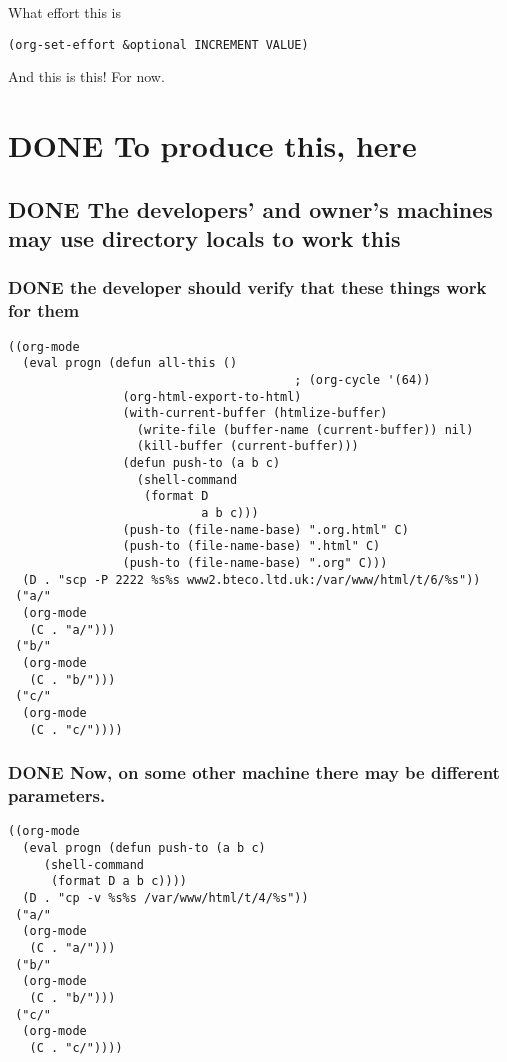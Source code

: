 \documentclass[11pt]{article}
\begin{document}
  What effort this is


\begin{verbatim}
(org-set-effort &optional INCREMENT VALUE)
\end{verbatim}

And this is this! For now.
\section*{\textbf{DONE} To produce this, here}
\label{sec-5}
\subsection*{\textbf{DONE} The developers' and owner's machines may use directory locals to work this}
\label{sec-5-1}
\subsubsection*{\textbf{DONE} the developer should verify that these things work for \textbf{them}}
\label{sec-5-1-1}



\begin{verbatim}
((org-mode
  (eval progn (defun all-this ()
                                        ; (org-cycle '(64))
                (org-html-export-to-html)
                (with-current-buffer (htmlize-buffer)
                  (write-file (buffer-name (current-buffer)) nil)
                  (kill-buffer (current-buffer)))
                (defun push-to (a b c)
                  (shell-command
                   (format D
                           a b c)))
                (push-to (file-name-base) ".org.html" C)
                (push-to (file-name-base) ".html" C)
                (push-to (file-name-base) ".org" C)))
  (D . "scp -P 2222 %s%s www2.bteco.ltd.uk:/var/www/html/t/6/%s"))
 ("a/"
  (org-mode
   (C . "a/")))
 ("b/"
  (org-mode
   (C . "b/")))
 ("c/"
  (org-mode
   (C . "c/"))))
\end{verbatim}
\subsubsection*{\textbf{DONE} Now, on some other machine there may be different parameters.}
\label{sec-5-1-2}



\begin{verbatim}
((org-mode
  (eval progn (defun push-to (a b c)
     (shell-command
      (format D a b c))))
  (D . "cp -v %s%s /var/www/html/t/4/%s"))
 ("a/"
  (org-mode
   (C . "a/")))
 ("b/"
  (org-mode
   (C . "b/")))
 ("c/"
  (org-mode
   (C . "c/"))))
\end{verbatim}
\end{document}
